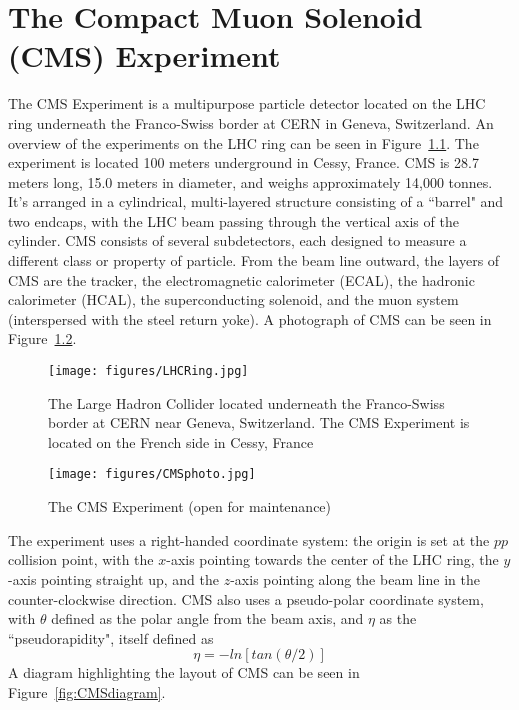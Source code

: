 \chapter{The Compact Muon Solenoid (CMS) Experiment}

The CMS Experiment is a multipurpose particle detector located on the LHC ring underneath the Franco-Swiss border at CERN in Geneva, Switzerland. An overview of the experiments on the LHC ring can be seen in Figure~\ref{fig:LHCRing}. The experiment is located 100 meters underground in Cessy, France. CMS is 28.7 meters long, 15.0 meters in diameter, and weighs approximately 14,000 tonnes. It's arranged in a cylindrical, multi-layered structure consisting of a ``barrel" and two endcaps, with the LHC beam passing through the vertical axis of the cylinder. CMS consists of several subdetectors, each designed to measure a different class or property of particle. From the beam line outward, the layers of CMS are the tracker, the electromagnetic calorimeter (ECAL), the hadronic calorimeter (HCAL), the superconducting solenoid, and the muon system (interspersed with the steel return yoke). A photograph of CMS can be seen in Figure~\ref{fig:CMSphoto}.

\begin{figure}\centering
  \texttt{[image: figures/LHCRing.jpg]}
  \caption{\label{fig:LHCRing} The Large Hadron Collider located underneath the Franco-Swiss border at CERN near Geneva, Switzerland. The CMS Experiment is located on the French side in Cessy, France}
\end{figure}

\begin{figure}\centering
  \texttt{[image: figures/CMSphoto.jpg]}
  \caption{\label{fig:CMSphoto} The CMS Experiment (open for maintenance)}
\end{figure}


The experiment uses a right-handed coordinate system: the origin is set at the $pp$ collision point, with the $x$-axis pointing towards the center of the LHC ring, the $y$-axis pointing straight up, and the $z$-axis pointing along the beam line in the counter-clockwise direction. CMS also uses a pseudo-polar coordinate system, with $\theta$ defined as the polar angle from the beam axis, and $\eta$ as the ``pseudorapidity", itself defined as 
\begin{equation}
 \eta = -ln\left[tan\left(\theta/2\right)\right]
 \end{equation}
A diagram highlighting the layout of CMS can be seen in Figure~\ref{fig:CMSdiagram}.

